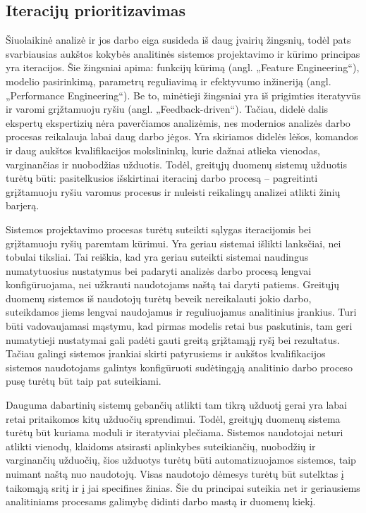 \documentclass{VUMIFPSkursinis}
\begin{document}
\subsection{Iteracijų prioritizavimas} \label{subsec:iteracijų}
Šiuolaikinė analizė ir jos darbo eiga susideda iš daug įvairių žingsnių, todėl pats svarbiausias aukštos kokybės analitinės sistemos projektavimo ir kūrimo principas yra iteracijos. Šie žingsniai apima: funkcijų kūrimą (angl. „Feature Engineering“), modelio pasirinkimą, parametrų reguliavimą ir efektyvumo inžineriją (angl. „Performance Engineering“). Be to, minėtieji žingsniai yra iš prigimties iteratyvūs ir varomi grįžtamuoju ryšiu (angl. „Feedback-driven“). Tačiau, didelė dalis ekspertų ekspertizių nėra paverčiamos analizėmis, nes modernios analizės darbo procesas reikalauja labai daug darbo jėgos. Yra skiriamos didelės lėšos, komandos ir daug aukštos kvalifikacijos mokslininkų, kurie dažnai atlieka vienodas, varginančias ir nuobodžias užduotis. Todėl, greitųjų duomenų sistemų užduotis turėtų būti: pasitelkusios išskirtinai iteracinį darbo procesą – pagreitinti grįžtamuoju ryšiu varomus procesus ir nuleisti reikalingų analizei atlikti žinių barjerą. \par
Sistemos projektavimo procesas turėtų suteikti sąlygas iteracijomis bei grįžtamuoju ryšių paremtam kūrimui. Yra geriau sistemai išlikti lanksčiai, nei tobulai tiksliai. Tai reiškia, kad yra geriau  suteikti sistemai naudingus numatytuosius nustatymus bei padaryti analizės darbo procesą lengvai konfigūruojama, nei užkrauti naudotojams naštą tai daryti patiems. Greitųjų duomenų sistemos iš naudotojų turėtų beveik nereikalauti jokio darbo, suteikdamos jiems lengvai naudojamus ir reguliuojamus analitinius įrankius. Turi būti vadovaujamasi mąstymu, kad pirmas modelis retai bus paskutinis, tam geri numatytieji nustatymai gali padėti gauti greitą grįžtamąjį ryšį bei rezultatus. Tačiau galingi sistemos įrankiai skirti patyrusiems ir aukštos kvalifikacijos sistemos naudotojams galintys konfigūruoti sudėtingąją analitinio darbo proceso pusę turėtų būt taip pat suteikiami. \par
Dauguma dabartinių sistemų gebančių atlikti tam tikrą užduotį gerai yra labai retai pritaikomos kitų užduočių sprendimui. Todėl, greitųjų duomenų sistema turėtų būt kuriama moduli ir iteratyviai plečiama. Sistemos naudotojai neturi atlikti vienodų, klaidoms atsirasti aplinkybes suteikiančių, nuobodžių ir varginančių užduočių, šios užduotys turėtų būti automatizuojamos sistemos, taip nuimant naštą nuo naudotojų. Visas naudotojo dėmesys turėtų būt sutelktas į taikomąją sritį ir į jai specifines žinias. Šie du principai suteikia net ir geriausiems analitiniams procesams galimybę didinti darbo mastą ir duomenų kiekį.
\end{document}
